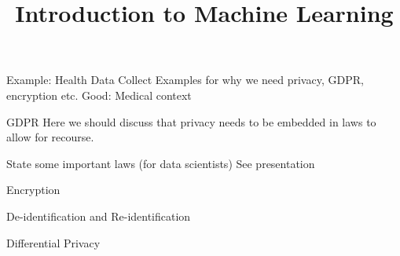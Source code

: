 


\newcommand{\learninggoals}{
\item XXXX
}


\title{Introduction to Machine Learning}
\date{}




\begin{vbframe}{Example: Health Data}
Collect Examples for why we need privacy, GDPR, encryption etc.
Good: Medical context


\end{vbframe}
\begin{vbframe}{GDPR}
Here we should discuss that privacy needs to be embedded in laws 
to allow for recourse.

State some important laws (for data scientists)
See presentation


\end{vbframe}
\begin{vbframe}{Encryption}


\end{vbframe}
\begin{vbframe}{De-identification and Re-identification}


\framebreak


\end{vbframe}
\begin{vbframe}{Differential Privacy}


\framebreak




\end{vbframe}
\endlecture

